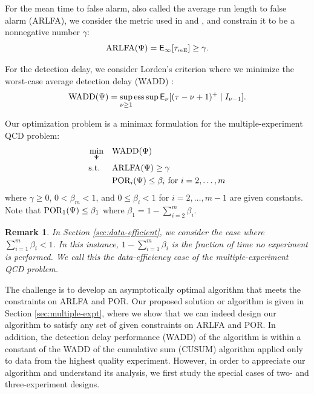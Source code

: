 \documentclass[journal, onecolumn]{IEEEtran}
\def\ds{\displaystyle}  %
\DeclareMathOperator{\esssup}{ess\,sup}  %
\newtheorem{remark}{Remark}
\begin{document}
For the mean time to false alarm, also called the average run length to false alarm (ARLFA), we consider the metric used in \cite{lorden1971} and \cite{pollak1985}, and constrain it to be a nonnegative number $\gamma$:
$$ \textup{ARLFA} (\Psi) = \mathsf{E}_\infty [\tau_{\textup{\fontsize{6 pt}{10 pt}\selectfont $m$E}}] \geq \gamma. $$

For the detection delay, we consider Lorden's criterion where we minimize the worst-case average detection delay (WADD) \cite{lorden1971}:
$$ \textup{WADD} (\Psi) = \sup_{\nu \geq 1} \esssup \mathsf{E}_\nu [(\tau - \nu + 1)^+ \mid I_{\nu - 1}]. $$

Our optimization problem is a minimax formulation for the multiple-experiment QCD problem:
\begin{align}
\begin{split}
\min_{\Psi} \quad & \textup{WADD} (\Psi) \\
\text{s.t. } \quad & \textup{ARLFA} (\Psi) \geq \gamma \\
& \textup{POR}_i (\Psi) \leq \beta_i \text{ for } i = 2, \dots, m
\end{split}
\label{eq:mE-qcd}
\end{align}
where $\gamma \geq 0$, $0 < \beta_m < 1$, and $0 \leq \beta_i < 1$ for $i = 2, \dots, m - 1$ are given constants. Note that $\textup{POR}_1 (\Psi) \leq \beta_1$ where $\ds \beta_1 = 1 - \sum_{i = 2}^m \beta_i$.

\begin{remark}
In Section \ref{sec:data-efficient}, we consider the case where $\ds \sum_{i = 1}^m \beta_i < 1$. In this instance, $\ds 1 - \sum_{i = 1}^m \beta_i$ is the fraction of time no experiment is performed. We call this the data-efficiency case of the multiple-experiment QCD problem.
\end{remark}

The challenge is to develop an asymptotically optimal algorithm that meets the constraints on ARLFA and POR. Our proposed solution or algorithm is given in Section \ref{sec:multiple-expt}, where we show that we can indeed design our algorithm to satisfy any set of given constraints on ARLFA and POR. In addition, the detection delay performance (WADD) of the algorithm is within a constant of the WADD of the cumulative sum (CUSUM) algorithm applied only to data from the highest quality experiment. However, in order to appreciate our algorithm and understand its analysis, we first study the special cases of two- and three-experiment designs.
\end{document}
